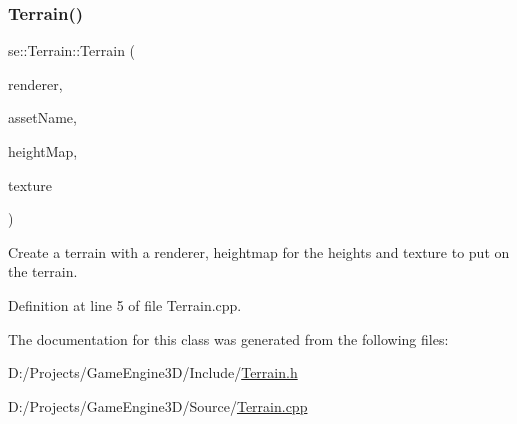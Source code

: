 \subsubsection{\texorpdfstring{Terrain()}{Terrain()}}
{\footnotesize\ttfamily se\+::\+Terrain\+::\+Terrain (\begin{DoxyParamCaption}\item[{\mbox{\hyperlink{classse_1_1_abstract_renderer}{Abstract\+Renderer}} $\ast$}]{renderer,  }\item[{const std\+::string \&}]{asset\+Name,  }\item[{const std\+::string \&}]{height\+Map,  }\item[{const std\+::string \&}]{texture }\end{DoxyParamCaption})}

Create a terrain with a renderer, heightmap for the heights and texture to put on the terrain. 

Definition at line 5 of file Terrain.\+cpp.



The documentation for this class was generated from the following files\+:\begin{DoxyCompactItemize}
\item 
D\+:/\+Projects/\+Game\+Engine3\+D/\+Include/\mbox{\hyperlink{_terrain_8h}{Terrain.\+h}}\item 
D\+:/\+Projects/\+Game\+Engine3\+D/\+Source/\mbox{\hyperlink{_terrain_8cpp}{Terrain.\+cpp}}\end{DoxyCompactItemize}
